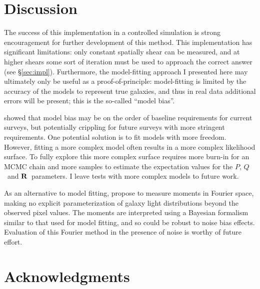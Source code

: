 \documentclass[usegraphicx,usenatbib]{mn2e}
\newcommand{\vecQ}{\mbox{\boldmath $Q$}}
\newcommand{\matR}{\mbox{$\bf R$}}
\begin{document}

\section{Discussion} \label{sec:summary}

The success of this implementation in a controlled simulation is strong
encouragement for further development of this method.  This implementation has
significant limitations:  only constant spatially shear can be measured, and at
higher shears some sort of iteration must be used to approach the correct
answer (see \S \ref{sec:impl}).  Furthermore, the model-fitting approach I
presented here may ultimately only be useful as a proof-of-principle:
model-fitting is limited by the accuracy of the models to represent true
galaxies, and thus in real data additional errors will be present; this is the
so-called ``model bias''.  

\cite{Kacprzak14} showed that model bias may be on the order of baseline
requirements for current surveys, but potentially crippling for future surveys
with more stringent requirements. One potential solution is to fit models with
more freedom.  However, fitting a more complex model often results in a more
complex likelihood surface. To fully explore this more complex surface requires
more burn-in for an MCMC chain and more samples to estimate the expectation
values for the $P$, \vecQ\ and \matR\ parameters.  I leave tests with more
complex models to future work.

As an alternative to model fitting, \cite{ba14} propose to measure moments in
Fourier space, making no explicit parameterization of galaxy light
distributions beyond the observed pixel values.  The moments are interpreted
using a Bayesian formalism similar to that used for model fitting, and so could
be robust to noise bias effects.  Evaluation of this Fourier method in the
presence of noise is worthy of future effort.

\section*{Acknowledgments}
\end{document}
